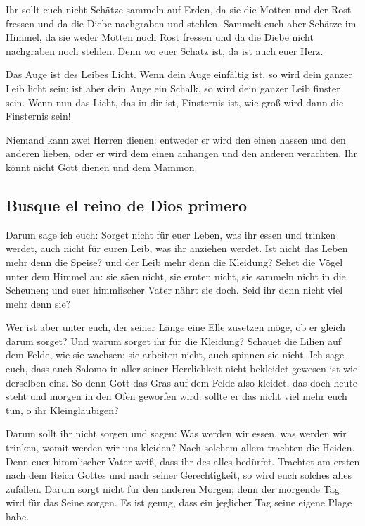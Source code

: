  Ihr sollt euch nicht Schätze sammeln auf Erden, da sie
die Motten und der Rost fressen und da die Diebe nachgraben und stehlen.
 Sammelt euch aber Schätze im Himmel, da sie weder Motten
noch Rost fressen und da die Diebe nicht nachgraben noch stehlen.
 Denn wo euer Schatz ist, da ist auch euer Herz.

 Das Auge ist des Leibes Licht. Wenn dein Auge einfältig
ist, so wird dein ganzer Leib licht sein;  ist aber dein
Auge ein Schalk, so wird dein ganzer Leib finster sein. Wenn nun das
Licht, das in dir ist, Finsternis ist, wie groß wird dann die Finsternis
sein!

 Niemand kann zwei Herren dienen: entweder er wird den
einen hassen und den anderen lieben, oder er wird dem einen anhangen und
den anderen verachten. Ihr könnt nicht Gott dienen und dem Mammon.

\hypertarget{busque-el-reino-de-dios-primero}{%
\subsection{Busque el reino de Dios
primero}\label{busque-el-reino-de-dios-primero}}

 Darum sage ich euch: Sorget nicht für euer Leben, was
ihr essen und trinken werdet, auch nicht für euren Leib, was ihr
anziehen werdet. Ist nicht das Leben mehr denn die Speise? und der Leib
mehr denn die Kleidung?  Sehet die Vögel unter dem Himmel
an: sie säen nicht, sie ernten nicht, sie sammeln nicht in die Scheunen;
und euer himmlischer Vater nährt sie doch. Seid ihr denn nicht viel mehr
denn sie?

 Wer ist aber unter euch, der seiner Länge eine Elle
zusetzen möge, ob er gleich darum sorget?  Und warum
sorget ihr für die Kleidung? Schauet die Lilien auf dem Felde, wie sie
wachsen: sie arbeiten nicht, auch spinnen sie nicht.  Ich
sage euch, dass auch Salomo in aller seiner Herrlichkeit nicht bekleidet
gewesen ist wie derselben eins.  So denn Gott das Gras
auf dem Felde also kleidet, das doch heute steht und morgen in den Ofen
geworfen wird: sollte er das nicht viel mehr euch tun, o ihr
Kleingläubigen?

 Darum sollt ihr nicht sorgen und sagen: Was werden wir
essen, was werden wir trinken, womit werden wir uns kleiden?
 Nach solchem allem trachten die Heiden. Denn euer
himmlischer Vater weiß, dass ihr des alles bedürfet. 
Trachtet am ersten nach dem Reich Gottes und nach seiner Gerechtigkeit,
so wird euch solches alles zufallen.  Darum sorgt nicht
für den anderen Morgen; denn der morgende Tag wird für das Seine sorgen.
Es ist genug, dass ein jeglicher Tag seine eigene Plage habe.

